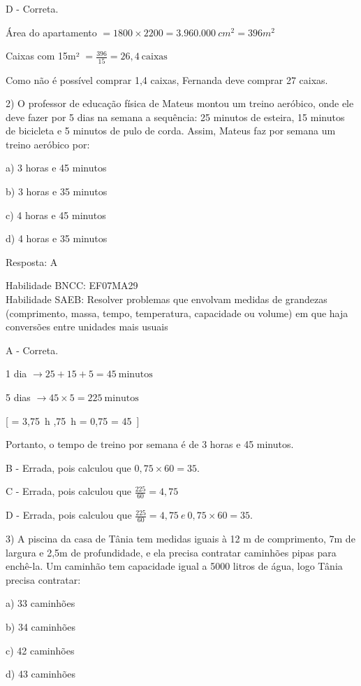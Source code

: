 D - Correta.

Área do apartamento \(= 1800 \times 2200 = 3.960.000\ cm^{2} = 396m^2\)

Caixas com 15m² \(= \frac{396}{15} = 26,4\ \text{caixas}\)

Como não é possível comprar 1,4 caixas, Fernanda deve comprar 27 caixas.

2) O professor de educação física de Mateus montou um treino aeróbico,
onde ele deve fazer por 5 dias na semana a sequência: 25 minutos de
esteira, 15 minutos de bicicleta e 5 minutos de pulo de corda. Assim,
Mateus faz por semana um treino aeróbico por:

a) 3 horas e 45 minutos

b) 3 horas e 35 minutos

c) 4 horas e 45 minutos

d) 4 horas e 35 minutos

Resposta: A

Habilidade BNCC: EF07MA29\\
Habilidade SAEB: Resolver problemas que envolvam medidas de grandezas
(comprimento, massa, tempo, temperatura, capacidade ou volume) em que
haja conversões entre unidades mais usuais

A - Correta.

1 dia \(\rightarrow 25 + 15 + 5 = 45\ \text{minutos}\)

5 dias \(\rightarrow 45 \times 5 = 225\ \text{minutos}\)

[ = 3,75\ h ,75\ h = 0,75  = 45\ ]

Portanto, o tempo de treino por semana é de 3 horas e 45 minutos.

B - Errada, pois calculou que \(0,75 \times 60 = 35\).

C - Errada, pois calculou que \(\frac{225}{60} = 4,75\)

D - Errada, pois calculou que
\(\frac{225}{60} = 4,75\ e\ 0,75 \times 60 = 35\).

3) A piscina da casa de Tânia tem medidas iguais à 12 m de comprimento,
7m de largura e 2,5m de profundidade, e ela precisa contratar caminhões
pipas para enchê-la. Um caminhão tem capacidade igual a 5000 litros de
água, logo Tânia precisa contratar:

a) 33 caminhões

b) 34 caminhões

c) 42 caminhões

d) 43 caminhões

